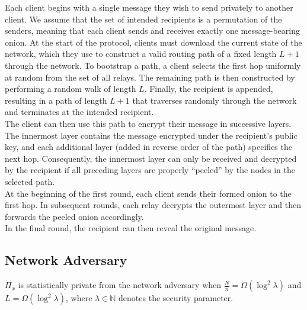 Each client begins with a single message they wish to send privately to another client. We assume that the set of intended recipients is a permutation of the senders, meaning that each client sends and receives exactly one message-bearing onion. At the start of the protocol, clients must download the current state of the network, which they use to construct a valid routing path of a fixed length $L + 1$ through the network. To bootstrap a path, a client selects the first hop uniformly at random from the set of all relays. The remaining path is then constructed by performing a random walk of length $L$. Finally, the recipient is appended, resulting in a path of length $L + 1$ that traverses randomly through the network and terminates at the intended recipient.\\

The client can then use this path to encrypt their message in successive layers. The innermost layer contains the message encrypted under the recipient’s public key, and each additional layer (added in reverse order of the path) specifies the next hop. Consequently, the innermost layer can only be received and decrypted by the recipient if all preceding layers are properly ``peeled'' by the nodes in the selected path.\\

At the beginning of the first round, each client sends their formed onion to the first hop. In subsequent rounds, each relay decrypts the outermost layer and then forwards the peeled onion accordingly.\\

In the final round, the recipient can then reveal the original message.

\subsection{Network Adversary}

\begin{theorem} \label{clm:network}
    $\Pi_x$ is statistically private from the network adversary when $\frac{N}{n} = \Omega(\log^2 \lambda)$ and $L = \Omega(\log^2 \lambda)$, where $\lambda \in \mathbb{N}$ denotes the security parameter.\\
\end{theorem}


